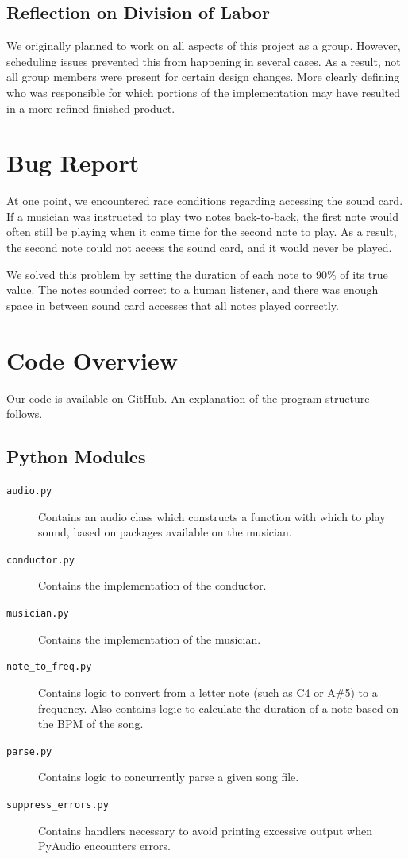 \documentclass[12pt, letterpaper]{article}
\begin{document}
\subsection{Reflection on Division of Labor}
We originally planned to work on all aspects of this project as a group. However, scheduling issues
prevented this from happening in several cases. As a result, not all group members were present for
certain design changes. More clearly defining who was responsible for which portions of the
implementation may have resulted in a more refined finished product.

\section{Bug Report}
At one point, we encountered race conditions regarding accessing the sound card. If a musician was
instructed to play two notes back-to-back, the first note would often still be playing when it came
time for the second note to play. As a result, the second note could not access the sound card, and
it would never be played.

We solved this problem by setting the duration of each note to 90\% of its true value. The notes
sounded correct to a human listener, and there was enough space in between sound card accesses that
all notes played correctly.

\section{Code Overview}
Our code is available on \href{https://github.com/TylerLubeck/ConcurrentMusic}{GitHub}. An
explanation of the program structure follows.

\subsection{Python Modules}
\begin{description}
\item[\texttt{audio.py}] Contains an audio class which constructs a function with which to play
sound, based on packages available on the musician.
\item[\texttt{conductor.py}] Contains the implementation of the conductor.
\item[\texttt{musician.py}] Contains the implementation of the musician.
\item[\texttt{note\_to\_freq.py}] Contains logic to convert from a letter note (such as C4 or A\#5)
to a frequency. Also contains logic to calculate the duration of a note based on the BPM of the
song.
\item[\texttt{parse.py}] Contains logic to concurrently parse a given song file.
\item[\texttt{suppress\_errors.py}] Contains handlers necessary to avoid printing excessive output
when PyAudio encounters errors.
\end{description}
\end{document}
